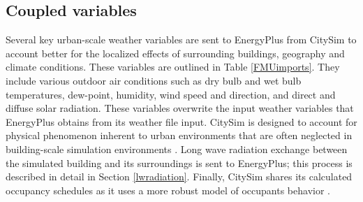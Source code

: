 \documentclass{tBPS2e}
\theoremstyle{plain}
\theoremstyle{definition}
\theoremstyle{remark}
\newcommand{\noteDT}[1]{\footnote{\textcolor{green}{#1}}}
\begin{document}


\subsection{Coupled variables}

Several key urban-scale weather variables are sent to EnergyPlus from CitySim
to account better for the localized effects of surrounding buildings,
geography and climate conditions. These variables are outlined in Table \ref{FMUimports}. 
They include various outdoor air
conditions such as dry bulb and wet bulb temperatures, dew-point, humidity, wind
speed and direction, and direct and diffuse solar radiation. These variables
overwrite the input weather variables that EnergyPlus obtains from its weather
file input. CitySim is designed to account for physical phenomenon inherent to
urban environments that are often neglected in building-scale simulation
environments \citep{Robinson:2004cr,Robinson:2009tm}. Long wave radiation
exchange between the simulated building and its surroundings is sent to
EnergyPlus; this process is described in detail in Section \ref{lwradiation}.
Finally, CitySim shares its calculated occupancy schedules as it uses a more
robust model of occupants behavior
\citep{Haldi:2011dr}.

\end{document}
